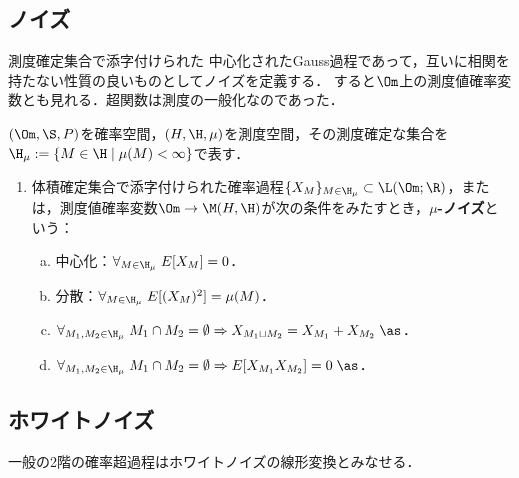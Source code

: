 \documentclass[uplatex,dvipdfmx]{jsreport}
\begin{document}
\subsection{ノイズ}

\begin{tcolorbox}[colframe=ForestGreen, colback=ForestGreen!10!white,breakable,colbacktitle=ForestGreen!40!white,coltitle=black,fonttitle=\bfseries\sffamily,
title=]
    測度確定集合で添字付けられた
    中心化されたGauss過程であって，互いに相関を持たない性質の良いものとしてノイズを定義する．
    すると$\Om$上の測度値確率変数とも見れる．超関数は測度の一般化なのであった．
\end{tcolorbox}

\begin{definition}
    $(\Om,\S,P)$を確率空間，$(H,\H,\mu)$を測度空間，その測度確定な集合を$\H_\mu:=\{M\in\H\mid\mu(M)<\infty\}$で表す．
    \begin{enumerate}
        \item 体積確定集合で添字付けられた確率過程$\{X_M\}_{M\in\H_\mu}\subset\L(\Om;\R)$，または，測度値確率変数$\Om\to\M(H,\H)$が次の条件をみたすとき，\textbf{$\mu$-ノイズ}という：
        \begin{enumerate}[(a)]
            \item 中心化：$\forall_{M\in\H_\mu}\;E[X_M]=0$．
            \item 分散：$\forall_{M\in\H_\mu}\;E[(X_M)^2]=\mu(M)$．
            \item $\forall_{M_1,M_2\in\H_\mu}\;M_1\cap M_2=\emptyset\Rightarrow X_{M_1\sqcup M_2}=X_{M_1}+X_{M_2}\;\as$．
            \item $\forall_{M_1,M_2\in\H_\mu}\;M_1\cap M_2=\emptyset\Rightarrow E[X_{M_1}X_{M_2}]=0\;\as$．
        \end{enumerate}
    \end{enumerate}
\end{definition}

\subsection{ホワイトノイズ}

\begin{tcolorbox}[colframe=ForestGreen, colback=ForestGreen!10!white,breakable,colbacktitle=ForestGreen!40!white,coltitle=black,fonttitle=\bfseries\sffamily,
title=]
    一般の2階の確率超過程はホワイトノイズの線形変換とみなせる．
\end{tcolorbox}
\end{document}
